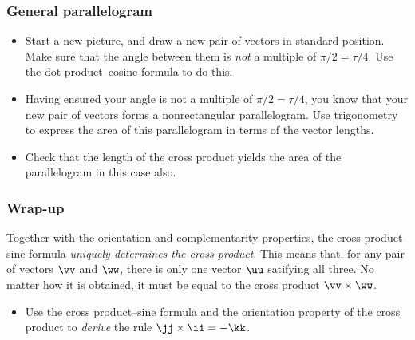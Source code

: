 \documentclass[11pt,ignorenonframetext,xcolor={svgnames},aspectratio=169]{beamer}
\begin{document}
\begin{frame}\frametitle{General parallelogram}

\begin{itemize}
\item
  Start a new picture, and draw a new pair of vectors in standard
  position. Make sure that the angle between them is \emph{not} a
  multiple of $\pi/2 = \tau/4$. Use the dot product--cosine formula to
  do this.
\item
  Having ensured your angle is not a multiple of $\pi/2 = \tau/4$, you
  know that your new pair of vectors forms a nonrectangular
  parallelogram. Use trigonometry to express the area of this
  parallelogram in terms of the vector lengths.
\item
  Check that the length of the cross product yields the area of the
  parallelogram in this case also.
\end{itemize}

\end{frame}

\begin{frame}\frametitle{Wrap-up}

Together with the orientation and complementarity properties, the cross
product--sine formula \emph{uniquely determines the cross product}. This
means that, for any pair of vectors $\vv$ and $\ww$, there is only one
vector $\uu$ satifying all three. No matter how it is obtained, it must
be equal to the cross product $\vv \times \ww$.

\begin{itemize}

\item
  Use the cross product--sine formula and the orientation property of
  the cross product to \emph{derive} the rule $\jj \times \ii = -\kk$.
\end{itemize}

\end{frame}
\end{document}
